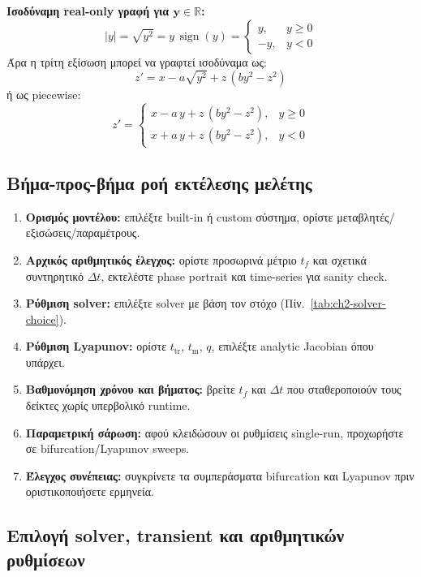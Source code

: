 \documentclass[11pt,a4paper]{report}
\begin{document}
\begin{guidebox}
\textbf{Ισοδύναμη real-only γραφή για \(\mathbf{y\in\mathbb{R}}\):}
\[
|y|=\sqrt{y^2}=y\,\operatorname{sign}(y)=
\begin{cases}
y, & y\ge 0\\
-y, & y<0
\end{cases}
\]
Άρα η τρίτη εξίσωση μπορεί να γραφτεί ισοδύναμα ως:
\[
z' = x - a\sqrt{y^2} + z\,(b y^2 - z^2)
\]
ή ως piecewise:
\[
z'=
\begin{cases}
x-a\,y+z\,(b y^2-z^2), & y\ge 0\\
x+a\,y+z\,(b y^2-z^2), & y<0
\end{cases}
\]
\end{guidebox}

\subsection{Βήμα-προς-βήμα ροή εκτέλεσης μελέτης}

\begin{guidebox}
\begin{enumerate}
\item \textbf{Ορισμός μοντέλου:} επιλέξτε built-in ή custom σύστημα, ορίστε μεταβλητές/εξισώσεις/παραμέτρους.
\item \textbf{Αρχικός αριθμητικός έλεγχος:} ορίστε προσωρινά μέτριο $t_f$ και σχετικά συντηρητικό $\Delta t$, εκτελέστε phase portrait και time-series για sanity check.
\item \textbf{Ρύθμιση solver:} επιλέξτε solver με βάση τον στόχο (Πίν.~\ref{tab:ch2-solver-choice}).
\item \textbf{Ρύθμιση Lyapunov:} ορίστε $t_{\mathrm{tr}}$, $t_{\mathrm{m}}$, $q$, επιλέξτε analytic Jacobian όπου υπάρχει.
\item \textbf{Βαθμονόμηση χρόνου και βήματος:} βρείτε $t_f$ και $\Delta t$ που σταθεροποιούν τους δείκτες χωρίς υπερβολικό runtime.
\item \textbf{Παραμετρική σάρωση:} αφού κλειδώσουν οι ρυθμίσεις single-run, προχωρήστε σε bifurcation/Lyapunov sweeps.
\item \textbf{Έλεγχος συνέπειας:} συγκρίνετε τα συμπεράσματα bifurcation και Lyapunov πριν οριστικοποιήσετε ερμηνεία.
\end{enumerate}
\end{guidebox}

\subsection{Επιλογή solver, transient και αριθμητικών ρυθμίσεων}
\end{document}

